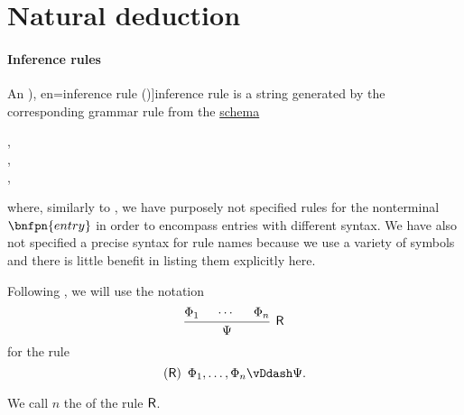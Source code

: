 \section{Natural deduction}\label{sec:natural_deduction}

\paragraph{Inference rules}

\begin{definition}\label{def:inference_rule}\mimprovised
  An \term[ru=правило вывода (\cite[31]{Герасимов2011Вычислимость}), en=inference rule (\cite[2]{MartinLöf1996LogicalLaws})]{inference rule} is a string generated by the corresponding grammar rule from the \hyperref[def:formal_grammar/schema]{schema}
  \begin{bnf*}
         { \bnfor {} \bnfsp \bnftsq{,} \bnfsp {}}, \\
           {\bnfves \bnfor {}}, \\
         {}, \\
     {\bnftsq{(} \bnfsp {} \bnfsp \bnftsq{)} \bnfsp {} \bnfsp \bnftsq{\( \vDdash \)} \bnfsp {}}
  \end{bnf*}
  where, similarly to , we have purposely not specified rules for the nonterminal \( \bnfpn{entry} \) in order to encompass entries with different syntax. We have also not specified a precise syntax for rule names because we use a variety of symbols and there is little benefit in listing them explicitly here.

  Following , we will use the notation
  \begin{equation*}
    \begin{prooftree}
      \hypo{ \Phi_1 }
      \hypo{ \cdots }
      \hypo{ \Phi_n }
      \infer3[\logic{R}]{ \Psi }
    \end{prooftree}
  \end{equation*}
  for the rule
  \begin{equation*}
    (\logic{R}) \enspace \Phi_1, \ldots, \Phi_n \vDdash \Psi.
  \end{equation*}

  We call \( n \) the  of the rule \( \textsf{R} \).
\end{definition}
